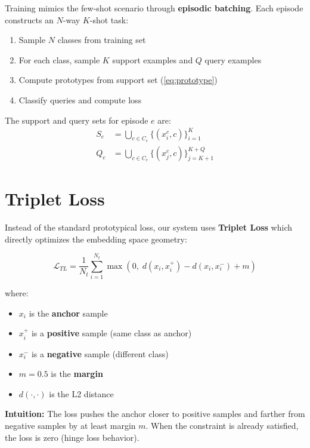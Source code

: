 \documentclass[12pt,a4paper]{report}
\begin{document}
Training mimics the few-shot scenario through \textbf{episodic batching}.
Each episode constructs an $N$-way $K$-shot task:

\begin{enumerate}
    \item Sample $N$ classes from training set
    \item For each class, sample $K$ support examples and $Q$ query examples
    \item Compute prototypes from support set (\cref{eq:prototype})
    \item Classify queries and compute loss
\end{enumerate}

The support and query sets for episode $e$ are:
\begin{align}
    S_e &= \bigcup_{c \in C_e} \{(x_i^c, c)\}_{i=1}^{K} \\
    Q_e &= \bigcup_{c \in C_e} \{(x_j^c, c)\}_{j=K+1}^{K+Q}
\end{align}

\section{Triplet Loss}
\label{sec:triplet}

Instead of the standard prototypical loss, our system uses \textbf{Triplet
Loss} \cite{rusci2023} which directly optimizes the embedding space geometry:

\begin{equation}
    \mathcal{L}_{TL} = \frac{1}{N_t} \sum_{i=1}^{N_t}
    \max\left(0, \; d(x_i, x_i^+) - d(x_i, x_i^-) + m\right)
    \label{eq:triplet}
\end{equation}

where:
\begin{itemize}
    \item $x_i$ is the \textbf{anchor} sample
    \item $x_i^+$ is a \textbf{positive} sample (same class as anchor)
    \item $x_i^-$ is a \textbf{negative} sample (different class)
    \item $m = 0.5$ is the \textbf{margin}
    \item $d(\cdot, \cdot)$ is the L2 distance
\end{itemize}

\textbf{Intuition:} The loss pushes the anchor closer to positive samples
and farther from negative samples by at least margin $m$. When the constraint
is already satisfied, the loss is zero (hinge loss behavior).
\end{document}
